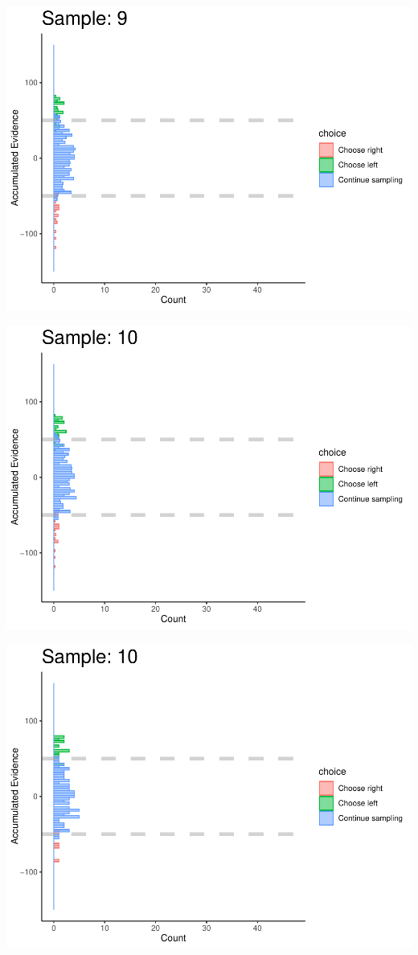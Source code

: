 \documentclass[
]{book}
\begin{document}
\begin{center}\includegraphics[width=0.8\linewidth]{LateNightBayes_files/figure-latex/fixed_check-88} \end{center}

\begin{center}\includegraphics[width=0.8\linewidth]{LateNightBayes_files/figure-latex/fixed_check-89} \end{center}

\begin{center}\includegraphics[width=0.8\linewidth]{LateNightBayes_files/figure-latex/fixed_check-90} \end{center}
\end{document}
